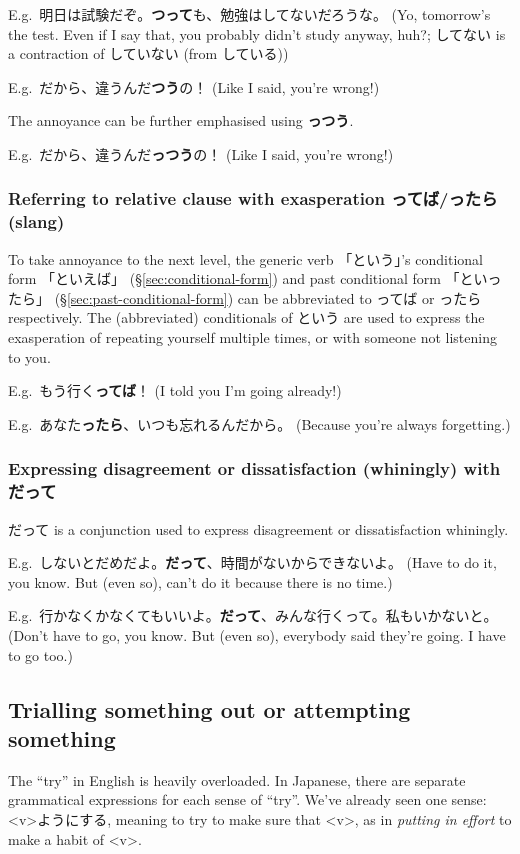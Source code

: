 \documentclass[../nihongo-gakushuu-kyouzai-grammar.tex]{subfiles}
\begin{document}
E.g.\ 明日は試験だぞ。\textbf{つって}も、勉強はしてないだろうな。 (Yo, tomorrow's the test. Even if I say that, you probably didn't study anyway, huh?; してない is a contraction of していない (from している))

E.g.\ だから、違うんだ\textbf{つう}の！ (Like I said, you're wrong!)

The annoyance can be further emphasised using \textbf{っつう}.

E.g.\ だから、違うんだ\textbf{っつう}の！ (Like I said, you're wrong!)


\subsubsection{Referring to relative clause with exasperation ってば/ったら (slang)} \label{sec:referring-to-relative-clause-exasperation-slang}
To take annoyance to the next level, the generic verb 「という」's conditional form 「といえば」 (\S\ref{sec:conditional-form}) and past conditional form 「といったら」 (\S\ref{sec:past-conditional-form}) can be abbreviated to ってば or ったら respectively. The (abbreviated) conditionals of という are used to express the exasperation of repeating yourself multiple times, or with someone not listening to you.

E.g.\ もう行く\textbf{ってば}！ (I told you I'm going already!)

E.g.\ あなた\textbf{ったら}、いつも忘れるんだから。 (Because you're always forgetting.)


\subsubsection{Expressing disagreement or dissatisfaction (whiningly) with だって}
だって is a conjunction used to express disagreement or dissatisfaction whiningly.

E.g.\ しないとだめだよ。\textbf{だって}、時間がないからできないよ。 (Have to do it, you know. But (even so), can't do it because there is no time.)

E.g.\ 行かなくかなくてもいいよ。\textbf{だって}、みんな行くって。私もいかないと。 (Don't have to go, you know. But (even so), everybody said they're going. I have to go too.)


\subsection{Trialling something out or attempting something} \label{sec:trialling-something-out-or-attempting-something}
The ``try'' in English is heavily overloaded. In Japanese, there are separate grammatical expressions for each sense of ``try''. We've already seen one sense: <v>ようにする, meaning to try to make sure that <v>, as in \emph{putting in effort} to make a habit of <v>.
\end{document}
